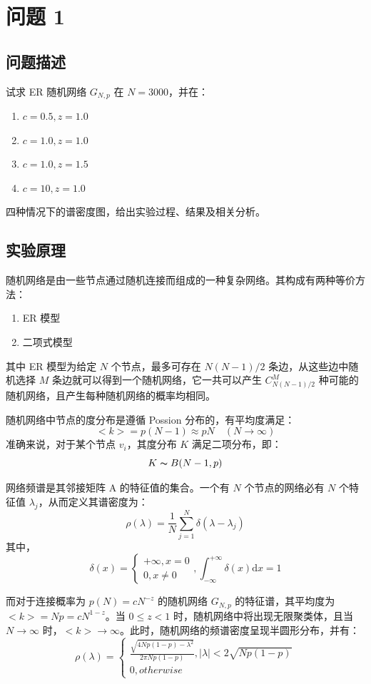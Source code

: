 \documentclass{article}
\date{10/23/2022}
\begin{document}
\makecover

\section{问题 1}

\subsection{问题描述}

试求 ER 随机网络 $G_{N, p}$ 在 $N=3000$，并在：
\begin{enumerate}
    \item $c=0.5,z=1.0$
    \item $c=1.0,z=1.0$
    \item $c=1.0,z=1.5$
    \item $c=10,z=1.0$
\end{enumerate}
四种情况下的谱密度图，给出实验过程、结果及相关分析。

\subsection{实验原理}

随机网络是由一些节点通过随机连接而组成的一种复杂网络。其构成有两种等价方法：
\begin{enumerate}
    \item ER 模型
    \item 二项式模型
\end{enumerate}
其中 ER 模型为给定 $N$ 个节点，最多可存在 $N(N-1)/2$ 条边，从这些边中随机选择 $M$ 条边就可以得到一个随机网络，它一共可以产生 $C_{N(N-1)/2}^{M}$ 种可能的随机网络，且产生每种随机网络的概率均相同。

随机网络中节点的度分布是遵循 Possion 分布的，有平均度满足：
$$
<k>=p(N-1)\approx pN \quad (N\to\infty)
$$
准确来说，对于某个节点 $v_i$，其度分布 $K$ 满足二项分布，即：
$$
K\thicksim B(N-1,p)
$$

网络频谱是其邻接矩阵 $\mathrm{A}$ 的特征值的集合。一个有 $N$ 个节点的网络必有 $N$ 个特征值 $\lambda_j$，从而定义其谱密度为：
$$
\rho(\lambda)=\frac{1}{N}\sum_{j=1}^{N}\delta(\lambda -\lambda_j)
$$
其中，
$$
\delta(x)=
\begin{cases}
    +\infty,x=0\\
    0,x\neq 0
\end{cases},
\int_{-\infty}^{+\infty}\delta(x){\mathrm{d}}x=1
$$

而对于连接概率为 $p(N)=cN^{-z}$ 的随机网络 $G_{N, p}$ 的特征谱，其平均度为 $<k>=Np=cN^{1-z}$。当 $0\leq z<1$ 时，随机网络中将出现无限聚类体，且当 $N\to\infty$ 时，$<k>\to\infty$。此时，随机网络的频谱密度呈现半圆形分布，并有：
$$
\rho(\lambda)=
\begin{cases}
    \frac{\sqrt{4Np(1-p)-\lambda^2}}{2\pi Np(1-p)},\vert \lambda\vert<2\sqrt{Np(1-p)}\\
    0, otherwise
\end{cases}
$$
\end{document}
